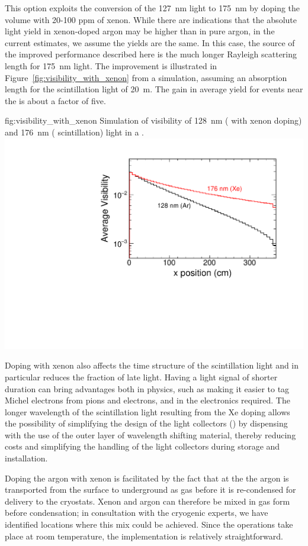 This option exploits the conversion of the  \SI{127}{nm} light to \SI{175}{nm} by doping the \lar volume with 20-100 ppm of xenon.  While there are indications that the absolute light yield in xenon-doped argon may be higher than in pure argon, in the current estimates, we assume the yields are the same. In this case, the source of the improved performance described here is the much longer Rayleigh scattering length for \SI{175}{nm} light.  The improvement is illustrated in Figure~\ref{fig:visibility_with_xenon} from a   simulation, assuming an absorption length for the scintillation light of \SI{20}{m}. The gain in average yield for events near the  is about a factor of five.

\begin{dunefigure}
{fig:visibility_with_xenon}
{Simulation of visibility of \SI{128}{nm} ( with xenon doping) and \SI{176}{nm} ( scintillation) light in a .}
\includegraphics[width=0.5\columnwidth]{graphics/pds-ly_with_xenon.pdf}
\end{dunefigure}

Doping with xenon also affects the time structure of the scintillation light and in particular reduces the fraction of late light.  Having a light signal of shorter duration can bring advantages both in physics, such as making it easier to tag Michel electrons from pions and electrons, and in the electronics required. The longer wavelength of the scintillation light resulting from the Xe doping allows the possibility of simplifying the design of the  light collectors () by dispensing with the use of the outer layer of wavelength shifting material, thereby reducing costs and simplifying the handling of the light collectors during storage and installation. 


Doping the argon with xenon is facilitated by the fact that at the   the argon is transported from the surface to underground as gas before it is re-condensed for delivery to the cryostats. Xenon and argon can therefore be mixed in gas form before condensation;  in consultation with the cryogenic experts, we have identified locations where this mix could be achieved. Since the operations take place at room temperature, the implementation is relatively straightforward.

